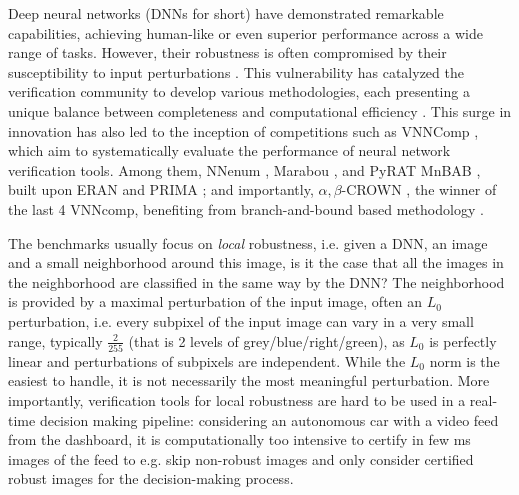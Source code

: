 Deep neural networks (DNNs for short) have demonstrated remarkable capabilities, achieving human-like or even superior performance across a wide range of tasks. However, their robustness is often compromised by their susceptibility to input perturbations \cite{szegedy}. This vulnerability has catalyzed the verification community to develop various methodologies, each presenting a unique balance between completeness and computational efficiency \cite{Marabou,Reluplex,deeppoly}. This surge in innovation has also led to the inception of competitions such as VNNComp \cite{VNNcomp}, which aim to systematically evaluate the performance of neural network verification tools. Among them, NNenum \cite{nnenum}, Marabou \cite{Marabou,Marabou2}, and PyRAT \cite{pyrat} MnBAB \cite{ferrari2022complete}, built upon ERAN \cite{deeppoly} and PRIMA \cite{prima}; and importantly, $\alpha,\beta$-CROWN \cite{crown,xu2020fast}, the winner of the last 4 VNNcomp, benefiting from branch-and-bound based methodology \cite{cutting,BaB}.

The benchmarks usually focus on {\em local} robustness, i.e. given a DNN, an image and a small neighborhood around this image, is it the case that all the images in the neighborhood are classified in the same way by the DNN? The neighborhood is provided by a maximal perturbation of the input image, often an $L_0$ perturbation, i.e. every subpixel of the input image can vary in a very small range, typically 
$\frac{2}{255}$ (that is 2 levels of grey/blue/right/green), as $L_0$ is perfectly linear and perturbations of subpixels are independent. While the $L_0$ norm is the easiest to handle, it is not necessarily the most meaningful perturbation.
More importantly, verification tools for local robustness are hard to be used in a real-time decision making pipeline: considering an autonomous car with a video feed from the dashboard, it is computationally too intensive to certify in few ms images of the feed to e.g. skip non-robust images and only consider certified robust images for the decision-making process.

\smallskip

